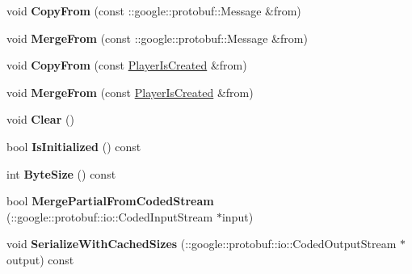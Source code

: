 \begin{DoxyCompactItemize}
\item 
\hypertarget{class_player_is_created_a5c404f5ee81f48971becae826bd7afec}{void {\bfseries Copy\-From} (const \-::google\-::protobuf\-::\-Message \&from)}\label{class_player_is_created_a5c404f5ee81f48971becae826bd7afec}

\item 
\hypertarget{class_player_is_created_ac6b4f0e6f5c1f465c5dbd4972cf168e3}{void {\bfseries Merge\-From} (const \-::google\-::protobuf\-::\-Message \&from)}\label{class_player_is_created_ac6b4f0e6f5c1f465c5dbd4972cf168e3}

\item 
\hypertarget{class_player_is_created_ab43a5a54241664baf89386f9d0c1a220}{void {\bfseries Copy\-From} (const \hyperlink{class_player_is_created}{Player\-Is\-Created} \&from)}\label{class_player_is_created_ab43a5a54241664baf89386f9d0c1a220}

\item 
\hypertarget{class_player_is_created_a341ddc4fd72b3d6046ba324a4a4ae87a}{void {\bfseries Merge\-From} (const \hyperlink{class_player_is_created}{Player\-Is\-Created} \&from)}\label{class_player_is_created_a341ddc4fd72b3d6046ba324a4a4ae87a}

\item 
\hypertarget{class_player_is_created_a42ba62c53797a0400873a181f706f014}{void {\bfseries Clear} ()}\label{class_player_is_created_a42ba62c53797a0400873a181f706f014}

\item 
\hypertarget{class_player_is_created_a3f8c85e6394c9681d6bc8550674b12a9}{bool {\bfseries Is\-Initialized} () const }\label{class_player_is_created_a3f8c85e6394c9681d6bc8550674b12a9}

\item 
\hypertarget{class_player_is_created_ac39384c2cda7d7478e5e237827995f1f}{int {\bfseries Byte\-Size} () const }\label{class_player_is_created_ac39384c2cda7d7478e5e237827995f1f}

\item 
\hypertarget{class_player_is_created_af968fcaea9bafaef6d27d1520ecb17df}{bool {\bfseries Merge\-Partial\-From\-Coded\-Stream} (\-::google\-::protobuf\-::io\-::\-Coded\-Input\-Stream $\ast$input)}\label{class_player_is_created_af968fcaea9bafaef6d27d1520ecb17df}

\item 
\hypertarget{class_player_is_created_aeedb3484a217702a0876097852c8fea8}{void {\bfseries Serialize\-With\-Cached\-Sizes} (\-::google\-::protobuf\-::io\-::\-Coded\-Output\-Stream $\ast$output) const }\label{class_player_is_created_aeedb3484a217702a0876097852c8fea8}


\end{DoxyCompactItemize}
